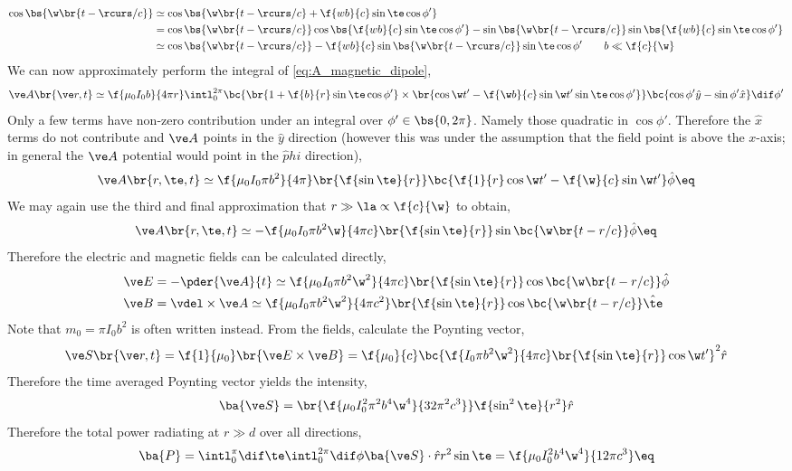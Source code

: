 \documentclass{article}
\begin{document}
\begin{align*}
    \cos \bs{\w\br{t - \rcurs/ c}}
    &\simeq \cos\bs{\w \br{t - \rcurs /c} + \f{wb}{c} \sin \te \cos \phi'} \\
    &= \cos\bs{\w \br{t - \rcurs /c}}\cos\bs{\f{wb}{c} \sin \te \cos \phi'} - \sin\bs{\w \br{t - \rcurs /c}}\sin\bs{\f{wb}{c} \sin \te \cos \phi'} \\
    &\simeq \cos\bs{\w \br{t - \rcurs /c}} - \f{wb}{c}\sin\bs{\w \br{t - \rcurs /c}} \sin \te \cos \phi' \qquad b \ll \f{c}{\w}
\end{align*}
We can now approximately perform the integral of \cref{eq:A_magnetic_dipole},
\[ \ve A\br{\ve r, t} \simeq \f{\mu_0 I_0 b}{4 \pi r} \intl_{0}^{2\pi} \bc{\br{1 + \f{b}{r}\sin \te \cos \phi'} \times \br{\cos \w t' - \f{\w b}{c} \sin \w t' \sin \te \cos \phi'}} \bc{\cos \phi'\hat y - \sin \phi' \hat x} \dif \phi' \]
Only a few terms have non-zero contribution under an integral over $\phi' \in \bs{0, 2\pi}$. Namely those quadratic in $\cos \phi'$. Therefore the $\hat x$ terms do not contribute and $\ve A$ points in the $\hat y$ direction (however this was under the assumption that the field point is above the $x$-axis; in general the $\ve A$ potential would point in the $\hat phi$ direction),
\[ \ve A\br{r, \te, t} \simeq \f{\mu_0 I_0 \pi b^2}{4 \pi}\br{\f{\sin \te}{r}} \bc{\f{1}{r} \cos \w t' - \f{\w}{c} \sin \w t'}\hat\phi \eq \label{eq:A_mag_no_approx}\]
We may again use the third and final approximation that $r \gg \la \propto \f{c}{\w}$ to obtain,
\[ \ve A\br{r, \te, t} \simeq -\f{\mu_0 I_0 \pi b^2 \w}{4 \pi c}\br{\f{\sin \te}{r}} \sin \bc{\w \br{t - r/c}} \hat\phi \eq \label{eq:A_mag}\]
Therefore the electric and magnetic fields can be calculated directly,
\begin{align*}
    \ve E &= - \pder{\ve A}{t} \simeq \f{\mu_0 I_0 \pi b^2 \w^2}{4 \pi c} \br{\f{\sin \te}{r}} \cos \bc{\w \br{t - r/c}}\hat \phi \\
    \ve B &= \vdel \times \ve A \simeq \f{\mu_0 I_0 \pi b^2 \w^2}{4 \pi c^2} \br{\f{\sin \te}{r}} \cos \bc{\w \br{t - r/c}}\hat \te
\end{align*}
Note that $m_0 = \pi I_0 b^2$ is often written instead. From the fields, calculate the Poynting vector,
\[ \ve S \br{\ve r, t} = \f{1}{\mu_0} \br{\ve E \times \ve B} = \f{\mu_0}{c} \bc{\f{I_0 \pi b^2 \w^2}{4 \pi c}\br{\f{\sin \te}{r}} \cos \w t'}^2 \hat r \]
Therefore the time averaged Poynting vector yields the intensity,
\[ \ba{\ve S} = \br{\f{\mu_0 I_0^2 \pi^2 b^4 \w^4}{32 \pi^2 c^3}}\f{\sin^2 \te}{r^2} \hat r \]
Therefore the total power radiating at $r \gg d$ over all directions,
\[ \ba{P} = \intl_{0}^{\pi} \dif \te \intl_{0}^{2 \pi} \dif \phi \ba{\ve S} \cdot \hat r r^2 \sin \te = \f{\mu_0 I_0^2 b^4 \w^4}{12 \pi c^3} \eq \label{eq:mag_dipole_radiation_power}\]
\end{document}
